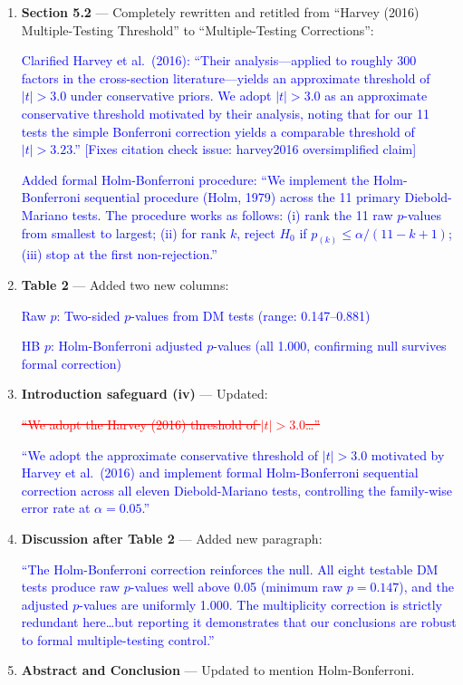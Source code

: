 \documentclass[12pt,a4paper]{article}
\newcommand{\added}[1]{\textcolor{blue}{#1}}
\newcommand{\removed}[1]{\textcolor{red}{\sout{#1}}}
\begin{document}
\begin{enumerate}

\item \textbf{Section 5.2} --- Completely rewritten and retitled from ``Harvey (2016) Multiple-Testing Threshold'' to ``Multiple-Testing Corrections'':

\added{Clarified Harvey et al.\ (2016): ``Their analysis---applied to roughly 300 factors in the cross-section literature---yields an approximate threshold of $|t| > 3.0$ under conservative priors. We adopt $|t| > 3.0$ as an approximate conservative threshold motivated by their analysis, noting that for our 11 tests the simple Bonferroni correction yields a comparable threshold of $|t| > 3.23$.'' [Fixes citation check issue: harvey2016 oversimplified claim]}

\added{Added formal Holm-Bonferroni procedure: ``We implement the Holm-Bonferroni sequential procedure (Holm, 1979) across the 11 primary Diebold-Mariano tests. The procedure works as follows: (i) rank the 11 raw $p$-values from smallest to largest; (ii) for rank $k$, reject $H_0$ if $p_{(k)} \leq \alpha / (11 - k + 1)$; (iii) stop at the first non-rejection.''}

\item \textbf{Table 2} --- Added two new columns:

\added{Raw $p$: Two-sided $p$-values from DM tests (range: 0.147--0.881)}

\added{HB $p$: Holm-Bonferroni adjusted $p$-values (all 1.000, confirming null survives formal correction)}

\item \textbf{Introduction safeguard (iv)} --- Updated:

\removed{``We adopt the Harvey (2016) threshold of $|t| > 3.0$\ldots''}

\added{``We adopt the approximate conservative threshold of $|t| > 3.0$ motivated by Harvey et al.\ (2016) and implement formal Holm-Bonferroni sequential correction across all eleven Diebold-Mariano tests, controlling the family-wise error rate at $\alpha = 0.05$.''}

\item \textbf{Discussion after Table 2} --- Added new paragraph:

\added{``The Holm-Bonferroni correction reinforces the null. All eight testable DM tests produce raw $p$-values well above 0.05 (minimum raw $p = 0.147$), and the adjusted $p$-values are uniformly 1.000. The multiplicity correction is strictly redundant here\ldots but reporting it demonstrates that our conclusions are robust to formal multiple-testing control.''}

\item \textbf{Abstract and Conclusion} --- Updated to mention Holm-Bonferroni.

\end{enumerate}
\end{document}
